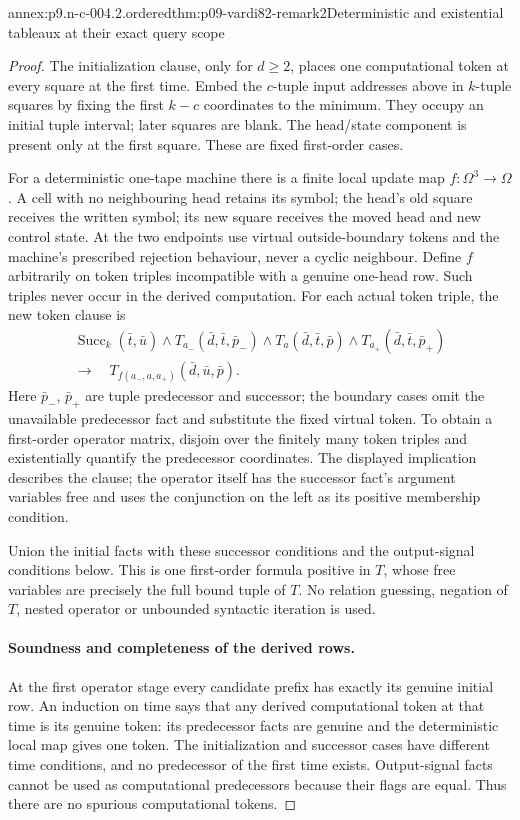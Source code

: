 \begin{annexitem}{annex:p9.n-c-004.2.ordered}{thm:p09-vardi82-remark2}{Deterministic and existential tableaux at their exact query scope}
\begin{proof}
The initialization clause, only for \(d\geq2\), places one computational
token at every square at the first time.  Embed the \(c\)-tuple input addresses above in \(k\)-tuple squares by
fixing the first \(k-c\) coordinates to the minimum. They occupy an
initial tuple interval; later squares are blank.  The head/state component
is present only at the first square.  These are fixed first-order cases.

For a deterministic one-tape machine there is a finite local update map
\(f:\Omega^3\to\Omega\).  A cell with no neighbouring head retains its
symbol; the head's old square receives the written symbol; its new square
receives the moved head and new control state.  At the two endpoints use
virtual outside-boundary tokens and the machine's prescribed rejection
behaviour, never a cyclic neighbour.  Define \(f\) arbitrarily on token
triples incompatible with a genuine one-head row.  Such triples never
occur in the derived computation.  For each actual token triple, the new
token clause is
\[
\begin{gathered}
 \operatorname{Succ}_k(\bar t,\bar u)\land
 T_{a_-}(\bar d,\bar t,\bar p_-)\land
 T_{a}(\bar d,\bar t,\bar p)\land
 T_{a_+}(\bar d,\bar t,\bar p_+)\\
 \longrightarrow\quad
 T_{f(a_-,a,a_+)}(\bar d,\bar u,\bar p).
\end{gathered}
\]
Here \(\bar p_-\), \(\bar p_+\) are tuple predecessor and successor;
the boundary cases omit the unavailable predecessor fact and substitute
the fixed virtual token.  To obtain a first-order operator matrix, disjoin
over the finitely many token triples and existentially quantify the
predecessor coordinates.  The displayed implication describes the clause;
the operator itself has the successor fact's argument variables free and
uses the conjunction on the left as its positive membership condition.

Union the initial facts with these successor conditions and the output-signal
conditions below.  This is one first-order formula positive in \(T\),
whose free variables are precisely the full bound tuple of \(T\).
No relation guessing, negation of \(T\), nested operator or unbounded
syntactic iteration is used.

\paragraph{Soundness and completeness of the derived rows.}
At the first operator stage every candidate prefix has exactly its genuine
initial row.  An induction on time says that any derived computational token
at that time is its genuine token: its predecessor facts are genuine and
the deterministic local map gives one token.  The initialization and
successor cases have different time conditions, and no predecessor of the
first time exists.  Output-signal facts cannot be used as computational
predecessors because their flags are equal.  Thus there are no spurious
computational tokens.


\end{proof}
\end{annexitem}
